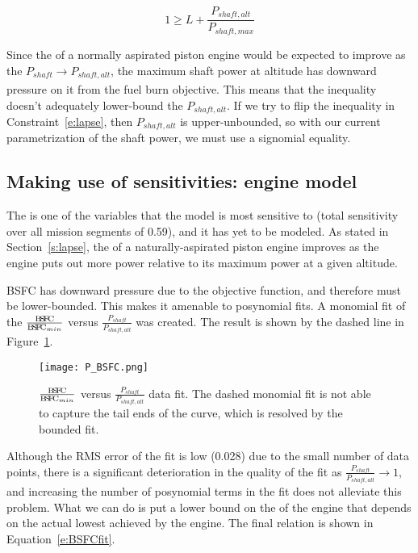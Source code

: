 \begin{equation}
    \label{e:lapse}
    1 \geq L + \frac{P_{shaft,alt}}{P_{shaft,max}}
\end{equation}

Since the \BSFC of a normally aspirated piston engine would be expected to improve
as the $P_{shaft} \xrightarrow[]{} P_{shaft,alt}$, the maximum shaft
power at altitude has downward pressure on it from the fuel burn objective. This means that the
inequality doesn't adequately lower-bound the $P_{shaft,alt}$. If we try to flip the inequality in
Constraint~\ref{e:lapse}, then $P_{shaft,alt}$ is upper-unbounded, so with our current parametrization
of the shaft power, we must use a signomial equality.

\subsection{Making use of sensitivities: engine \BSFC model}
\label{s:BSFC}

The \BSFC is one of the variables that the model is most sensitive to (total sensitivity over all mission segments of 0.59),
and it has yet to be modeled. As
stated in Section~\ref{s:lapse}, the \BSFC of a naturally-aspirated piston engine improves as the engine
puts out more power relative to its maximum power at a given altitude.

BSFC has downward pressure due to the objective function, and therefore must be lower-bounded. This makes
it amenable to posynomial fits.
A monomial fit of the $\frac{\BSFC}{\BSFC_{min}}$ versus $\frac{P_{shaft}}{P_{shaft,alt}}$ was created.
The result is shown by the dashed line in Figure~\ref{f:P_BSFC}.

\begin{figure}
    \centering
    \texttt{[image: P\_BSFC.png]}
    \caption[$\frac{\BSFC}{\BSFC_{min}}$ versus $\frac{P_{shaft}}{P_{shaft,alt}}$ data fit.]{$\frac{\BSFC}{\BSFC_{min}}$
    versus $\frac{P_{shaft}}{P_{shaft,alt}}$ data fit. The dashed monomial fit is
    not able to capture the tail ends of the curve, which is resolved by the bounded fit.}
    \label{f:P_BSFC}
\end{figure}

Although the RMS error of the fit is low (0.028) due to the small number of data points,
there is a significant deterioration in the quality of the
fit as $\frac{P_{shaft}}{P_{shaft,alt}} \xrightarrow[]{} 1$,
and increasing the number of posynomial terms in the fit does not alleviate this problem.
What we can do is put a lower bound on the \BSFC of the engine that depends on the actual
lowest \BSFC achieved by the engine. The final \BSFC relation is shown in Equation~\ref{e:BSFCfit}.

